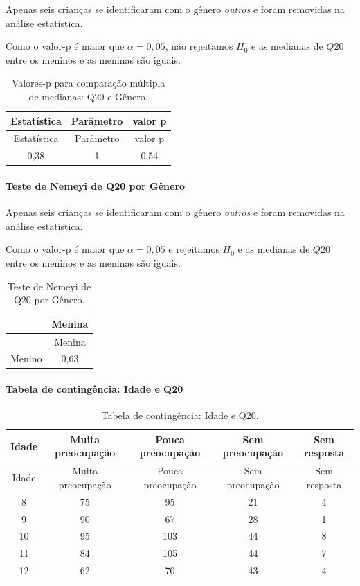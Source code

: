 \documentclass[]{article}
\let\oldparagraph\paragraph
\renewcommand{\paragraph}[1]{\oldparagraph{#1}\mbox{}}
\begin{document}
Apenas seis crianças se identificaram com o gênero \emph{outros} e foram removidas na análise estatística.

Como o valor-p é maior que \(\alpha=0,05\), não rejeitamos \(H_0\) e as medianas de \(Q20\) entre os meninos e as meninas são iguais.

\begin{longtable}[]{@{}ccc@{}}
\caption{\label{tab:unnamed-chunk-300}Valores-p para comparação múltipla de medianas: Q20 e Gênero.}\tabularnewline
\toprule
Estatística & Parâmetro & valor p\tabularnewline
\midrule
\endfirsthead
\toprule
Estatística & Parâmetro & valor p\tabularnewline
\midrule
\endhead
0,38 & 1 & 0,54\tabularnewline
\bottomrule
\end{longtable}

\hypertarget{teste-de-nemeyi-de-q20-por-guxeanero}{%
\paragraph{Teste de Nemeyi de Q20 por Gênero}\label{teste-de-nemeyi-de-q20-por-guxeanero}}

Apenas seis crianças se identificaram com o gênero \emph{outros} e foram removidas na análise estatística.

Como o valor-p é maior que \(\alpha=0,05\) e rejeitamos \(H_0\) e as medianas de \(Q20\) entre os meninos e as meninas são iguais.

\begin{longtable}[]{@{}lc@{}}
\caption{\label{tab:unnamed-chunk-301}Teste de Nemeyi de Q20 por Gênero.}\tabularnewline
\toprule
& Menina\tabularnewline
\midrule
\endfirsthead
\toprule
& Menina\tabularnewline
\midrule
\endhead
Menino & 0,63\tabularnewline
\bottomrule
\end{longtable}

\cleardoublepage

\hypertarget{tabela-de-continguxeancia-idade-e-q20}{%
\paragraph{Tabela de contingência: Idade e Q20}\label{tabela-de-continguxeancia-idade-e-q20}}

\begin{longtable}[]{@{}ccccc@{}}
\caption{\label{tab:unnamed-chunk-302}Tabela de contingência: Idade e Q20.}\tabularnewline
\toprule
Idade & Muita preocupação & Pouca preocupação & Sem preocupação & Sem resposta\tabularnewline
\midrule
\endfirsthead
\toprule
Idade & Muita preocupação & Pouca preocupação & Sem preocupação & Sem resposta\tabularnewline
\midrule
\endhead
8 & 75 & 95 & 21 & 4\tabularnewline
9 & 90 & 67 & 28 & 1\tabularnewline
10 & 95 & 103 & 44 & 8\tabularnewline
11 & 84 & 105 & 44 & 7\tabularnewline
12 & 62 & 70 & 43 & 4\tabularnewline
\bottomrule
\end{longtable}
\end{document}

